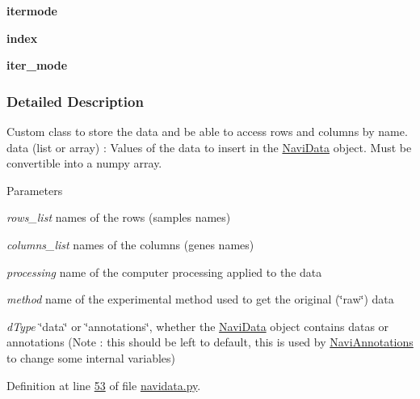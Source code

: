 \begin{DoxyCompactItemize}
\item 
\hypertarget{classnavicom_1_1navidata_1_1NaviData_a21c96bfd996af8dd4a12877aa54d4393}{
{\bfseries itermode}}
\label{classnavicom_1_1navidata_1_1NaviData_a21c96bfd996af8dd4a12877aa54d4393}

\item 
\hypertarget{classnavicom_1_1navidata_1_1NaviData_adb2e7ce6c9a691a186d91d4a8d49864a}{
{\bfseries index}}
\label{classnavicom_1_1navidata_1_1NaviData_adb2e7ce6c9a691a186d91d4a8d49864a}

\item 
\hypertarget{classnavicom_1_1navidata_1_1NaviData_ac21c979a9421ac607778d907380475fc}{
{\bfseries iter\_\-mode}}
\label{classnavicom_1_1navidata_1_1NaviData_ac21c979a9421ac607778d907380475fc}

\end{DoxyCompactItemize}


\subsubsection{Detailed Description}
Custom class to store the data and be able to access rows and columns by name. data (list or array) : Values of the data to insert in the \hyperlink{classnavicom_1_1navidata_1_1NaviData}{NaviData} object. Must be convertible into a numpy array. 
\begin{DoxyParams}{Parameters}
\item[{\em rows\_\-list}]names of the rows (samples names) \item[{\em columns\_\-list}]names of the columns (genes names) \item[{\em processing}]name of the computer processing applied to the data \item[{\em method}]name of the experimental method used to get the original (\char`\"{}raw\char`\"{}) data \item[{\em dType}]\char`\"{}data\char`\"{} or \char`\"{}annotations\char`\"{}, whether the \hyperlink{classnavicom_1_1navidata_1_1NaviData}{NaviData} object contains datas or annotations (Note : this should be left to default, this is used by \hyperlink{classnavicom_1_1navidata_1_1NaviAnnotations}{NaviAnnotations} to change some internal variables) \end{DoxyParams}


Definition at line \hyperlink{navidata_8py_source_l00053}{53} of file \hyperlink{navidata_8py_source}{navidata.py}.



